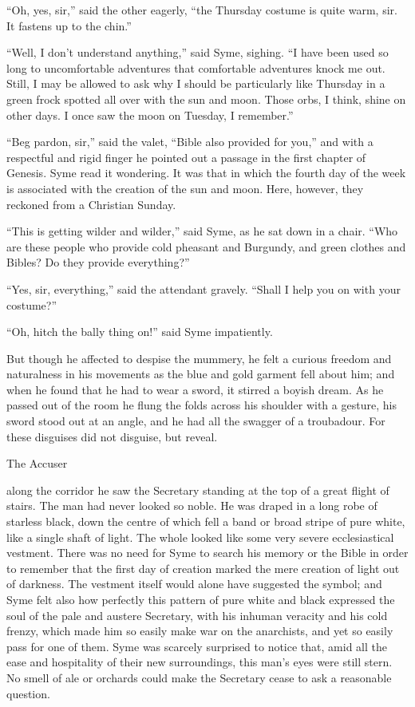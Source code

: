 “Oh, yes, sir,” said the other eagerly, “the Thursday costume is quite warm, sir. It fastens up to the chin.”

“Well, I don’t understand anything,” said Syme, sighing. “I have been used so long to uncomfortable adventures that comfortable adventures knock me out. Still, I may be allowed to ask why I should be particularly like Thursday in a green frock spotted all over with the sun and moon. Those orbs, I think, shine on other days. I once saw the moon on Tuesday, I remember.”

“Beg pardon, sir,” said the valet, “Bible also provided for you,” and with a respectful and rigid finger he pointed out a passage in the first chapter of Genesis. Syme read it wondering. It was that in which the fourth day of the week is associated with the creation of the sun and moon. Here, however, they reckoned from a Christian Sunday.

“This is getting wilder and wilder,” said Syme, as he sat down in a chair. “Who are these people who provide cold pheasant and Burgundy, and green clothes and Bibles? Do they provide everything?”

“Yes, sir, everything,” said the attendant gravely. “Shall I help you on with your costume?”

“Oh, hitch the bally thing on!” said Syme impatiently.

But though he affected to despise the mummery, he felt a curious freedom and naturalness in his movements as the blue and gold garment fell about him; and when he found that he had to wear a sword, it stirred a boyish dream. As he passed out of the room he flung the folds across his shoulder with a gesture, his sword stood out at an angle, and he had all the swagger of a troubadour. For these disguises did not disguise, but reveal.

\chap[accuser] The Accuser

 along the corridor he saw the Secretary standing at the top of a great flight of stairs. The man had never looked so noble. He was draped in a long robe of starless black, down the centre of which fell a band or broad stripe of pure white, like a single shaft of light. The whole looked like some very severe ecclesiastical vestment. There was no need for Syme to search his memory or the Bible in order to remember that the first day of creation marked the mere creation of light out of darkness. The vestment itself would alone have suggested the symbol; and Syme felt also how perfectly this pattern of pure white and black expressed the soul of the pale and austere Secretary, with his inhuman veracity and his cold frenzy, which made him so easily make war on the anarchists, and yet so easily pass for one of them. Syme was scarcely surprised to notice that, amid all the ease and hospitality of their new surroundings, this man’s eyes were still stern. No smell of ale or orchards could make the Secretary cease to ask a reasonable question.

